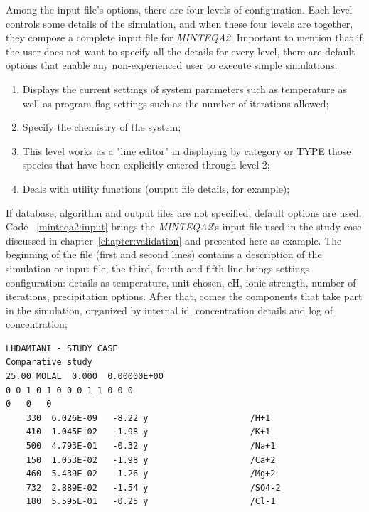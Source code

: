 Among the input file's options, there are four levels of configuration. Each level controls some details of the simulation, and when these four levels are together, they compose a complete input file for \emph{MINTEQA2}. Important to mention that if the user does not want to specify all the details for every level, there are default options that enable any non-experienced user to execute simple simulations.
\begin{enumerate}
\item Displays the current settings of system parameters such as temperature as well as program flag settings such as the number of iterations allowed;
\item Specify the chemistry of the system;
\item This level works as a "line editor" in displaying by category or TYPE those species that have been explicitly entered through level 2;
\item Deals with utility functions (output file details, for example);
\end{enumerate}

If database, algorithm and output files are not specified, default options are used. Code ~\ref{minteqa2:input}  brings the \emph{MINTEQA2}'s input file used in the study case discussed in chapter~\ref{chapter:validation} and presented here as example. The beginning of the file (first and second lines) contains  a description of the simulation or input file; the third, fourth and fifth line brings settings configuration: details as temperature, unit chosen, eH, ionic strength, number of iterations, precipitation options. After that, comes the components that take part in the simulation, organized by internal id, concentration details and log of concentration;

\begin{minipage}[c]{0.92\textwidth}
\begin{lstlisting}[frame=single, caption=\emph{MINTEQA2}'s input file, label=minteqa2:input]
LHDAMIANI - STUDY CASE
Comparative study           
25.00 MOLAL  0.000  0.00000E+00
0 0 1 0 1 0 0 0 1 1 0 0 0
0   0   0
    330  6.026E-09   -8.22 y                    /H+1               
    410  1.045E-02   -1.98 y                    /K+1               
    500  4.793E-01   -0.32 y                    /Na+1              
    150  1.053E-02   -1.98 y                    /Ca+2              
    460  5.439E-02   -1.26 y                    /Mg+2              
    732  2.889E-02   -1.54 y                    /SO4-2             
    180  5.595E-01   -0.25 y                    /Cl-1              

\end{lstlisting}
\end{minipage}



